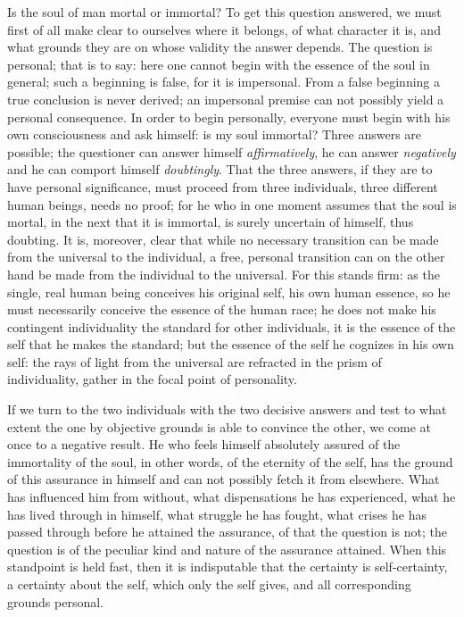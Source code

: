 \documentclass[12pt,a4paper,openany]{book}
\newcommand{\opage}[1]{\marginnote{\footnotesize\textit{[#1]}}}
\begin{document}
Is the soul of man mortal or immortal? To
get this question answered, we must first of all make clear
to ourselves where it belongs, of what character
it is, and what grounds they are on whose validity
the answer depends. The question is personal; that
is to say: here one cannot begin with the essence of the soul in
general; such a beginning is false, for it
\setcounter{footnote}{0}%
\opage{616}is impersonal. From a false beginning a true conclusion is never
derived; an impersonal premise can not possibly
yield a personal consequence. In order to begin
personally, everyone must begin with his own consciousness
and ask himself: is my soul immortal? Three
answers are possible; the questioner can answer himself
\emph{affirmatively}, he can answer \emph{negatively} and he can
comport himself \emph{doubtingly}. That the three answers, if they are
to have personal significance, must proceed from three individuals,
three different human beings, needs no proof;
for he who in one moment assumes that the soul
is mortal, in the next that it is immortal, is surely uncertain
of himself, thus doubting. It is, moreover,
clear that while no necessary transition can be
made from the universal to the individual, a free, personal transition
can on the other hand be made from the individual
to the universal. For this stands firm: as
the single, real human being conceives his
original self, his own human essence, so
he must necessarily conceive the essence of the human race;
he does not make his contingent individuality the standard
for other individuals, it is the essence of the self that he makes the
standard; but the essence of the self he cognizes in his own
self: the rays of light from the universal are refracted in the prism
of individuality, gather in the focal point of personality.

If we turn to the two individuals with the two decisive
answers and test to what extent the one by objective
grounds is able to convince the other, we come
at once to a negative result. He who feels himself absolutely
assured of the immortality of the soul, in other words,
of the eternity of the self, has the ground of this assurance
\setcounter{footnote}{0}%
\opage{617}in himself and can not possibly fetch it from elsewhere.
What has influenced him from without, what dispensations
he has experienced, what he has lived through in himself,
what struggle he has fought, what crises he has
passed through before he attained the assurance, of that
the question is not; the question is of the peculiar kind
and nature of the assurance attained. When this
standpoint is held fast, then it is indisputable that the certainty
is self-certainty, a certainty about the self, which only the self
gives, and all corresponding grounds personal.
\end{document}
